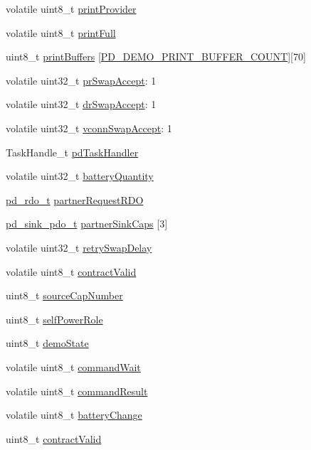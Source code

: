 \begin{DoxyCompactItemize}
volatile uint8\-\_\-t \hyperlink{struct__pd__app_a5ed6114200d041b6c16989abea86dbde}{print\-Provider}
\item 
volatile uint8\-\_\-t \hyperlink{struct__pd__app_ace27760f393eeceee39cf902b659cb67}{print\-Full}
\item 
uint8\-\_\-t \hyperlink{struct__pd__app_acae5bdb8d3a1a7624d440d766596a062}{print\-Buffers} \mbox{[}\hyperlink{pd__app_8h_a521a768b4f33e6978fd649b8c538d170}{P\-D\-\_\-\-D\-E\-M\-O\-\_\-\-P\-R\-I\-N\-T\-\_\-\-B\-U\-F\-F\-E\-R\-\_\-\-C\-O\-U\-N\-T}\mbox{]}\mbox{[}70\mbox{]}
\item 
volatile uint32\-\_\-t \hyperlink{struct__pd__app_ae6928ddf7cec733c1244b9f6a2034452}{pr\-Swap\-Accept}\-: 1
\item 
volatile uint32\-\_\-t \hyperlink{struct__pd__app_a7c929e9d267016ae697a553a72528987}{dr\-Swap\-Accept}\-: 1
\item 
volatile uint32\-\_\-t \hyperlink{struct__pd__app_ad3460ca1eda49e355b0b155671ba2823}{vconn\-Swap\-Accept}\-: 1
\item 
Task\-Handle\-\_\-t \hyperlink{struct__pd__app_a120cdb4cb3b4a22de6cf2db174d53920}{pd\-Task\-Handler}
\item 
volatile uint32\-\_\-t \hyperlink{struct__pd__app_a0c2c01fcb1b30a9b27dbb8ea83d7647b}{battery\-Quantity}
\item 
\hyperlink{group__usb__pd__stack_ga4dcb1103574222cf94d4b45128f2b884}{pd\-\_\-rdo\-\_\-t} \hyperlink{struct__pd__app_aff1ed842707beaa8768ec52f9e22c91b}{partner\-Request\-R\-D\-O}
\item 
\hyperlink{group__usb__pd__stack_gaf835814fe2dcf1f17e9e0c58bc74b6ba}{pd\-\_\-sink\-\_\-pdo\-\_\-t} \hyperlink{struct__pd__app_a7352c7eab0272ca6e34859d1f14acfab}{partner\-Sink\-Caps} \mbox{[}3\mbox{]}
\item 
volatile uint32\-\_\-t \hyperlink{struct__pd__app_ae2690cba6796bc0ab60086bbb39d3a37}{retry\-Swap\-Delay}
\item 
volatile uint8\-\_\-t \hyperlink{struct__pd__app_aa51e69529584a27879d6822e64f6c1c1}{contract\-Valid}
\item 
uint8\-\_\-t \hyperlink{struct__pd__app_ae4e4a09f3e6488703f5a7dbc6de96902}{source\-Cap\-Number}
\item 
uint8\-\_\-t \hyperlink{struct__pd__app_af2438fe1e518c3b17672853036e7487e}{self\-Power\-Role}
\item 
uint8\-\_\-t \hyperlink{struct__pd__app_ab62809cc014aa5182f48a2414a7d785c}{demo\-State}
\item 
volatile uint8\-\_\-t \hyperlink{struct__pd__app_a5fb16448ac6d446eaf7fc758bff182d0}{command\-Wait}
\item 
volatile uint8\-\_\-t \hyperlink{struct__pd__app_aad9f6262f331cbc8c594dada122c31dd}{command\-Result}
\item 
volatile uint8\-\_\-t \hyperlink{struct__pd__app_a588a6313718bb3ee5f8bb272d420824c}{battery\-Change}
\item 
uint8\-\_\-t \hyperlink{struct__pd__app_ae4c3014e24b07a1578a505e7ef76746c}{contract\-Valid}
\end{DoxyCompactItemize}


